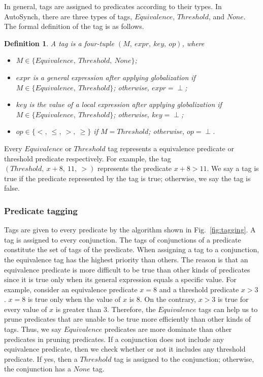 \documentclass[preprint]{sigplanconf}
\newtheorem{definition}{Definition}
\begin{document}
In general, tags are assigned to predicates according to their types. In 
AutoSynch, there are three types of tags, $Equivalence$, $Threshold$, and 
$None$. The formal definition of the tag is as follows. 
\begin{definition}
   A tag is a four-tuple $(M,\ expr,\ key,\ op)$, where  
   \begin{itemize}
      \item $M \in \{Equivalence,\ Threshold,\ None\}$;
      \item $expr$ is a general expression after applying globalization if 
          $M \in \{Equivalence,\ Threshold\}$; otherwise, $expr= \perp$;
      \item $key$ is the value of a local expression after applying
          globalization if $M \in \{Equivalence,\ Threshold\}$; otherwise, 
          $key= \perp$;
      \item $op \in \{<,\ \le,\ >,\ \ge\}$ if $M = Threshold$; otherwise, 
         $op = \perp$.
   \end{itemize}
\end{definition}
Every $Equivalence$ or $Threshold$ tag represents a equivalence predicate or 
threshold predicate respectively. For example, the tag 
$(Threshold,\ x + 8,\ 11,\ >)$ represents the predicate $x + 8 > 11$. 
We say a tag is true if the predicate represented by the tag is true; 
otherwise, we say the tag is false. 
\subsubsection{Predicate tagging}
Tags are given to every predicate by the algorithm shown in
Fig.~\ref{fig:tagging}. A tag is assigned to every conjunction. The tags of 
conjunctions of a predicate constitute the set of tags of the predicate. 
When assigning a tag to a conjunction, the equivalence tag has the highest 
priority than others. The reason is that an equivalence predicate is more
difficult to be true than other kinds of predicates since it is true only when 
its general expression equals a specific value. 
For example, consider an equivalence 
predicate $x = 8$ and a threshold predicate $x > 3$. $x = 8$ is true only when 
the value of $x$ is $8$. On the contrary, $x > 3$ is true for every value of 
$x$ is greater than $3$. Therefore, the $Equivalence$ tags can help us to prune
predicates that are unable to be true more efficiently than other kinds of
tags. Thus, we say $Equivalence$ predicates are more dominate than other
predicates in pruning predicates.  
If a conjunction does not 
include any equivalence predicate, then we check whether or not it 
includes any threshold predicate. If yes, then a $Threshold$ tag is assigned 
to the conjunction; otherwise, the conjunction has a $None$ tag. 
\end{document}
